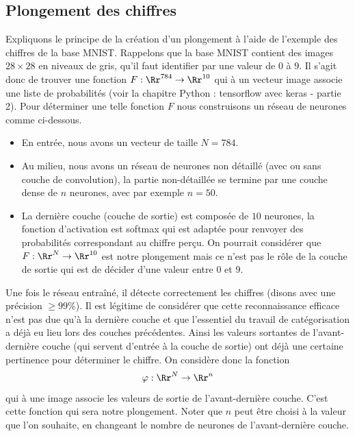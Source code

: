\documentclass[11pt,class=report,crop=false]{standalone}
\begin{document}

\subsection{Plongement des chiffres}

Expliquons le principe de la création d'un plongement à l'aide de l'exemple des chiffres de la base MNIST.
Rappelons que la base MNIST contient des images $28 \times 28$ en niveaux de gris, qu'il faut identifier par une valeur de $0$ à $9$. Il s'agit donc de trouver une fonction $F : \Rr^{784} \to \Rr^{10}$ qui à un vecteur image associe une liste de probabilités (voir la chapitre \og{}Python : tensorflow avec keras - partie 2\fg{}).
Pour déterminer une telle fonction $F$ nous construisons un réseau de neurones comme ci-dessous.



\begin{itemize}
	\item En entrée, nous avons un vecteur de taille $N = 784$.
	
	\item Au milieu, nous avons un réseau de neurones non détaillé (avec ou sans couche de convolution), la partie non-détaillée se termine par une couche dense de $n$ neurones, avec par exemple $n=50$. 
	
	\item La dernière couche (couche de sortie) est composée de $10$ neurones, la fonction d'activation est softmax qui est adaptée pour renvoyer des probabilités correspondant au chiffre perçu. On pourrait considérer que $F : \Rr^N \to \Rr^{10}$ est notre plongement mais ce n'est pas le rôle de la couche de sortie qui est de décider d'une valeur entre $0$ et $9$.
	
\end{itemize}
	
Une fois le réseau entraîné, il détecte correctement les chiffres (disons avec une précision $\ge 99\%$). Il est légitime de considérer que cette reconnaissance efficace n'est pas due qu'à la dernière couche et que l'essentiel du travail de catégorisation a déjà eu lieu lors des couches précédentes.
Ainsi les valeurs sortantes de l'avant-dernière couche (qui servent d'entrée à la couche de sortie) ont déjà une certaine pertinence pour déterminer le chiffre.
On considère donc la fonction 
$$\varphi : \Rr^N \to \Rr^n$$
qui à une image associe les valeurs de sortie de l'avant-dernière couche. C'est cette fonction qui sera notre plongement.
Noter que $n$ peut être choisi à la valeur que l'on souhaite, en changeant le nombre de neurones de l'avant-dernière couche.
\end{document}
